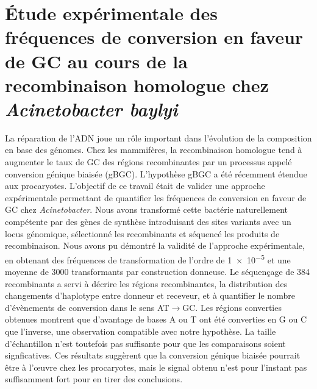 \blankpage


\section*{\large \centering Étude expérimentale des fréquences de conversion en faveur de GC au
  cours de la recombinaison homologue chez \emph{Acinetobacter baylyi}}
\thispagestyle{empty}

La réparation de l'ADN joue un rôle important dans l'évolution de la composition
en base des génomes. Chez les mammifères, la recombinaison homologue tend à
augmenter le taux de GC des régions recombinantes par un processus appelé
conversion génique biaisée (gBGC). L'hypothèse gBGC a été récemment étendue aux
procaryotes. L'objectif de ce travail était de valider une approche
expérimentale permettant de quantifier les fréquences de conversion en faveur de
GC chez \emph{Acinetobacter}. Nous avons transformé cette bactérie naturellement
compétente par des gènes de synthèse introduisant des sites variants avec un
locus génomique, sélectionné les recombinants et séquencé les produits de
recombinaison. Nous avons pu démontré la validité de l'approche expérimentale,
en obtenant des fréquences de transformation de l'ordre de \num{1e-5} et une
moyenne de \num{3000} transformants par construction donneuse. Le séquençage de
\num{384} recombinants a servi à décrire les régions recombinantes, la
distribution des changements d'haplotype entre donneur et receveur, et à
quantifier le nombre d'évènements de conversion dans le sens AT$\rightarrow$GC.
Les régions converties obtenues montrent que d'avantage de bases A ou T ont été
converties en G ou C que l'inverse, une observation compatible avec notre
hypothèse. La taille d'échantillon n'est toutefois pas suffisante pour que les
comparaisons soient signficatives. Ces résultats suggèrent que la conversion
génique biaisée pourrait être à l'œuvre chez les procaryotes, mais le signal
obtenu n'est pour l'instant pas suffisamment fort pour en tirer des conclusions.
